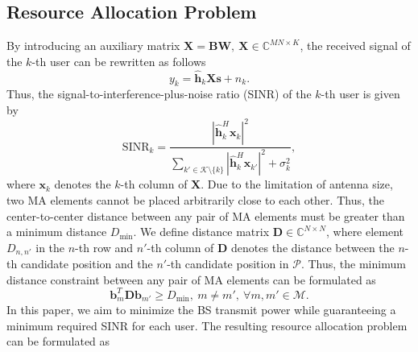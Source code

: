 \documentclass[12pt, draftclsnofoot, onecolumn]{IEEEtran}
\begin{document}
\subsection{Resource Allocation Problem}
 By introducing an auxiliary matrix $\mathbf{X}=\mathbf{B}\mathbf{W},\ \mathbf{X}\in\mathbb{C}^{MN\times K}$, the received signal of the $k$-th user can be rewritten as follows
\begin{equation}
    y_k=\hat{\mathbf{h}}_k\mathbf{X}\mathbf{s}+n_k.
\end{equation}
Thus, the signal-to-interference-plus-noise ratio (SINR) of the $k$-th user is given by
\begin{equation}
    \mathrm{SINR}_k=\frac{|\hat{\mathbf{h}}_k^H\mathbf{x}_k|^2}{\sum_{k'\in\mathcal{K}\setminus\{k\}}|\hat{\mathbf{h}}_k^H\mathbf{x}_{k'}|^2+\sigma_{k}^2},
\end{equation}
where $\mathbf{x}_k$ denotes the $k$-th column of $\mathbf{X}$. Due to the limitation of antenna size, two MA elements cannot be placed arbitrarily close to each other. Thus, the center-to-center distance between any pair of MA elements must be greater than a minimum distance $D_{\mathrm{min}}$. We define distance matrix $\mathbf{D}\in\mathbb{C}^{N\times N}$, where element $D_{n,n'}$ in the $n$-th row and $n'$-th column of $\mathbf{D}$ denotes the distance between the $n$-th candidate position and the $n'$-th candidate position in $\mathcal{P}$. Thus, the minimum distance constraint between any pair of MA elements can be formulated as 
\begin{equation}
    \mathbf{b}_m^T\mathbf{D}\mathbf{b}_{m'}\geq D_{\mathrm{min}},\ m\neq m',\ \forall m, m'\in\mathcal{M}.
\end{equation}
In this paper, we aim to minimize the BS transmit power while guaranteeing a minimum required SINR for each user. The resulting resource allocation problem can be formulated as%
\end{document}
